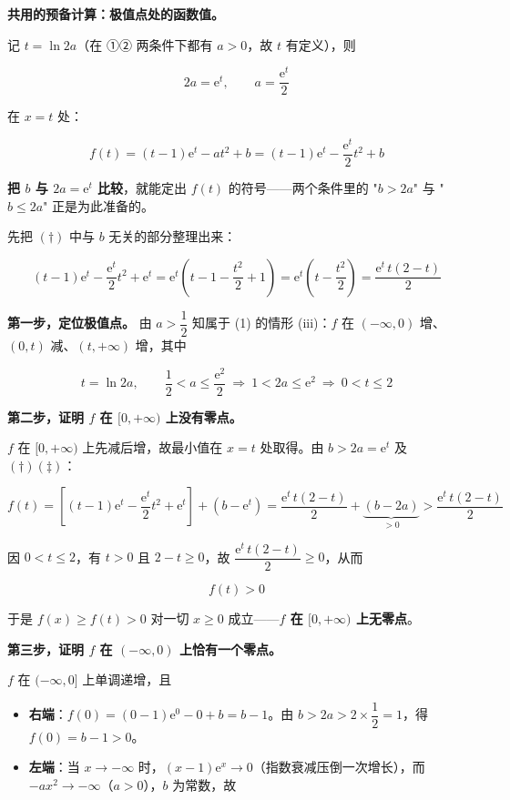 \textbf{共用的预备计算：极值点处的函数值。}

记 $t=\ln2a$（在 ①② 两条件下都有 $a>0$，故 $t$ 有定义），则

\[2a=\mathrm e^{t},\qquad a=\frac{\mathrm e^{t}}2\]

在 $x=t$ 处：

\[f(t)=(t-1)\mathrm e^{t}-at^{2}+b=(t-1)\mathrm e^{t}-\frac{\mathrm e^{t}}2t^{2}+b\tag{$\dagger$}\]

\textbf{把 $b$ 与 $2a=\mathrm e^{t}$ 比较}，就能定出 $f(t)$ 的符号——两个条件里的 "$b>2a$" 与 "$b\le2a$" 正是为此准备的。

先把 $(\dagger)$ 中与 $b$ 无关的部分整理出来：

\[(t-1)\mathrm e^{t}-\frac{\mathrm e^{t}}2t^{2}+\mathrm e^{t}=\mathrm e^{t}\left(t-1-\frac{t^{2}}2+1\right)=\mathrm e^{t}\left(t-\frac{t^{2}}2\right)=\frac{\mathrm e^{t}\,t(2-t)}2\tag{$\ddagger$}\]

\par\medskip


\textbf{第一步，定位极值点。} 由 $a>\dfrac12$ 知属于 (1) 的情形 (iii)：$f$ 在 $(-\infty,0)$ 增、$(0,t)$ 减、$(t,+\infty)$ 增，其中

\[t=\ln2a,\qquad \frac12<a\le\frac{\mathrm e^{2}}2\ \Longrightarrow\ 1<2a\le\mathrm e^{2}\ \Longrightarrow\ 0<t\le2\]

\textbf{第二步，证明 $f$ 在 $[0,+\infty)$ 上没有零点。}

$f$ 在 $[0,+\infty)$ 上先减后增，故最小值在 $x=t$ 处取得。由 $b>2a=\mathrm e^{t}$ 及 $(\dagger)(\ddagger)$：

\[f(t)=\left[(t-1)\mathrm e^{t}-\frac{\mathrm e^{t}}2t^{2}+\mathrm e^{t}\right]+\left(b-\mathrm e^{t}\right)=\frac{\mathrm e^{t}\,t(2-t)}2+\underbrace{\left(b-2a\right)}_{>0}>\frac{\mathrm e^{t}\,t(2-t)}2\]

因 $0<t\le2$，有 $t>0$ 且 $2-t\ge0$，故 $\dfrac{\mathrm e^{t}\,t(2-t)}2\ge0$，从而

\[f(t)>0\]

于是 $f(x)\ge f(t)>0$ 对一切 $x\ge0$ 成立——\textbf{$f$ 在 $[0,+\infty)$ 上无零点}。

\textbf{第三步，证明 $f$ 在 $(-\infty,0)$ 上恰有一个零点。}

$f$ 在 $(-\infty,0]$ 上单调递增，且

\begin{itemize}
\item \textbf{右端}：$f(0)=(0-1)\mathrm e^{0}-0+b=b-1$。由 $b>2a>2\times\dfrac12=1$，得 $f(0)=b-1>0$。
\item \textbf{左端}：当 $x\to-\infty$ 时，$(x-1)\mathrm e^{x}\to0$（指数衰减压倒一次增长），而 $-ax^{2}\to-\infty$（$a>0$），$b$ 为常数，故
\end{itemize}

